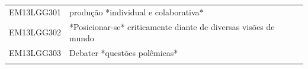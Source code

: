 \documentclass[12pt]{extarticle}
\begin{document}
\begin{longtable}{ll}
EM13LGG301 & produção *individual e colaborativa*                                                                                                                                                                                                                                                                                                                                                                                                                                                                                                                                                                                                                                                                                                                                                                                  \\
\rowcolor[HTML]{FFF} 
EM13LGG302 & *Posicionar-se* criticamente diante de diversas visões de mundo                                                                                                                                                                                                                                                                                                                                                                                                                                                                                                                                                                                                                                                                                                                                                       \\
\rowcolor[HTML]{E0F7FA} 
EM13LGG303 & Debater *questões polêmicas*                                                                                                                                                                                                                                                                                                                                                                                                                                                                                                                                                                                                                                                                                                                                                                                          \\
\rowcolor[HTML]{FFF} 

\end{longtable}
\end{document}
